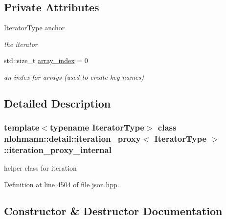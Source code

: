 \subsection*{Private Attributes}
\begin{DoxyCompactItemize}
\item 
Iterator\+Type \hyperlink{classnlohmann_1_1detail_1_1iteration__proxy_1_1iteration__proxy__internal_a994faf46a2f04ecb85d17b74641611a6}{anchor}
\begin{DoxyCompactList}\small\item\em the iterator \end{DoxyCompactList}\item 
std\+::size\+\_\+t \hyperlink{classnlohmann_1_1detail_1_1iteration__proxy_1_1iteration__proxy__internal_a3e9a5b1afe857cdf73bc1b31e9746273}{array\+\_\+index} = 0
\begin{DoxyCompactList}\small\item\em an index for arrays (used to create key names) \end{DoxyCompactList}\end{DoxyCompactItemize}


\subsection{Detailed Description}
\subsubsection*{template$<$typename Iterator\+Type$>$\newline
class nlohmann\+::detail\+::iteration\+\_\+proxy$<$ Iterator\+Type $>$\+::iteration\+\_\+proxy\+\_\+internal}

helper class for iteration 

Definition at line 4504 of file json.\+hpp.



\subsection{Constructor \& Destructor Documentation}
\mbox{\label{classnlohmann_1_1detail_1_1iteration__proxy_1_1iteration__proxy__internal_a6db8effc48d1a83fa10a3d4e1a30c931}} 
